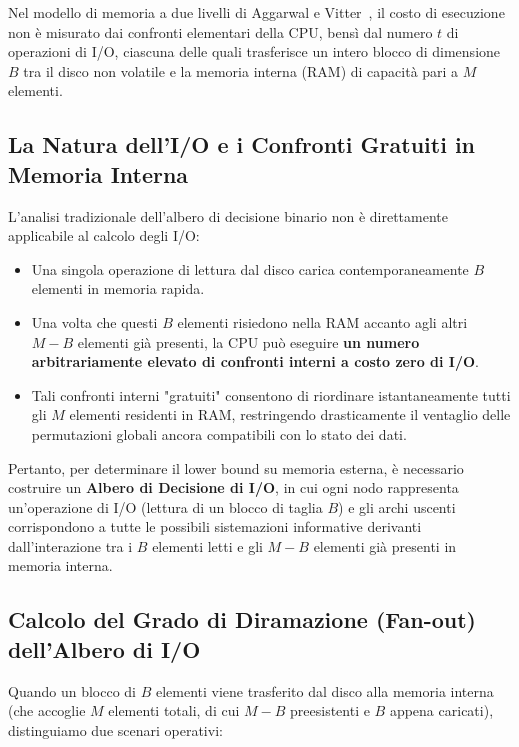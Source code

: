 Nel modello di memoria a due livelli di Aggarwal e Vitter~\cite{aggarwal1988}, il costo di esecuzione non è misurato dai confronti elementari della CPU, bensì dal numero $t$ di operazioni di I/O, ciascuna delle quali trasferisce un intero blocco di dimensione $B$ tra il disco non volatile e la memoria interna (RAM) di capacità pari a $M$ elementi.

\FloatBarrier
\subsection{La Natura dell'I/O e i Confronti Gratuiti in Memoria Interna}
\label{subsec:free-comparisons-intuition}

L'analisi tradizionale dell'albero di decisione binario non è direttamente applicabile al calcolo degli I/O:
\begin{itemize}
  \item Una singola operazione di lettura dal disco carica contemporaneamente $B$ elementi in memoria rapida.
  \item Una volta che questi $B$ elementi risiedono nella RAM accanto agli altri $M - B$ elementi già presenti, la CPU può eseguire \textbf{un numero arbitrariamente elevato di confronti interni a costo zero di I/O}.
  \item Tali confronti interni "gratuiti" consentono di riordinare istantaneamente tutti gli $M$ elementi residenti in RAM, restringendo drasticamente il ventaglio delle permutazioni globali ancora compatibili con lo stato dei dati.
\end{itemize}

Pertanto, per determinare il lower bound su memoria esterna, è necessario costruire un \textbf{Albero di Decisione di I/O}, in cui ogni nodo rappresenta un'operazione di I/O (lettura di un blocco di taglia $B$) e gli archi uscenti corrispondono a tutte le possibili sistemazioni informative derivanti dall'interazione tra i $B$ elementi letti e gli $M - B$ elementi già presenti in memoria interna.

\FloatBarrier
\subsection{Calcolo del Grado di Diramazione (Fan-out) dell'Albero di I/O}
\label{subsec:fanout-calculation}

Quando un blocco di $B$ elementi viene trasferito dal disco alla memoria interna (che accoglie $M$ elementi totali, di cui $M - B$ preesistenti e $B$ appena caricati), distinguiamo due scenari operativi:

